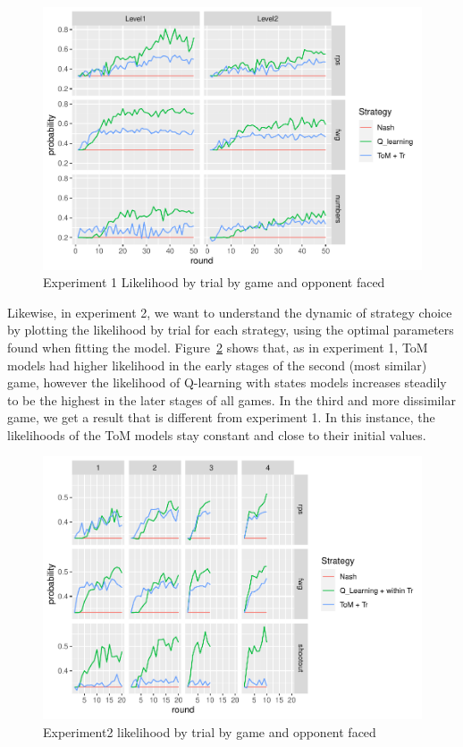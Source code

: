 \documentclass[man,floatsintext]{apa6}
\begin{document}
\begin{figure}

{\centering \includegraphics{draft_report_v3_files/figure-latex/exp1-lik-by-tr-1} 

}

\caption{Experiment 1 Likelihood by trial by game and opponent faced}\label{fig:exp1-lik-by-tr}
\end{figure}

Likewise, in experiment 2, we want to understand the dynamic of strategy choice by plotting the likelihood by trial for each strategy, using the optimal parameters found when fitting the model. Figure~\ref{fig:exp2-lik-by-tr} shows that, as in experiment 1, ToM models had higher likelihood in the early stages of the second (most similar) game, however the likelihood of Q-learning with states models increases steadily to be the highest in the later stages of all games. In the third and more dissimilar game, we get a result that is different from experiment 1. In this instance, the likelihoods of the ToM models stay constant and close to their initial values.

\begin{figure}

{\centering \includegraphics{draft_report_v3_files/figure-latex/exp2-lik-by-tr-1} 

}

\caption{Experiment2 likelihood by trial by game and opponent faced}\label{fig:exp2-lik-by-tr}
\end{figure}
\end{document}

